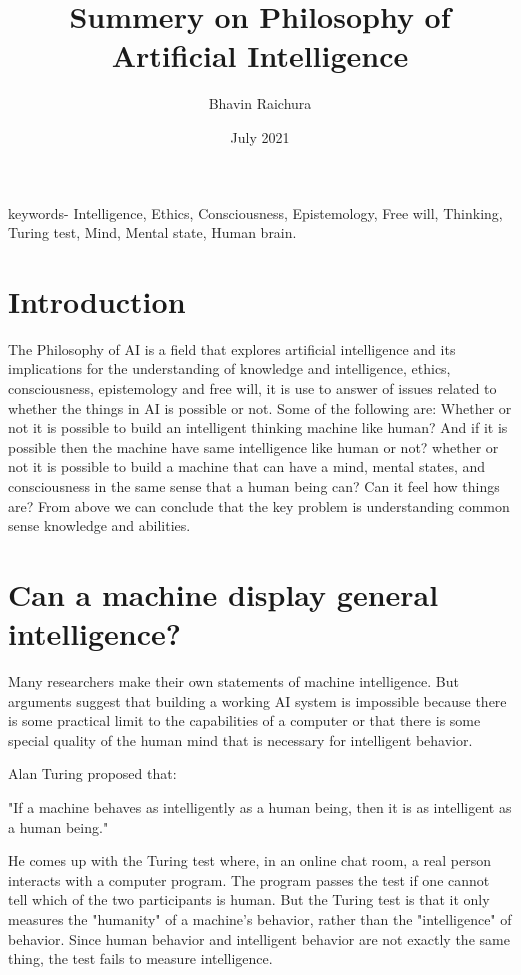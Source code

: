 \documentclass{article}
\title{Summery on Philosophy of  Artificial Intelligence}
\author{Bhavin Raichura}
\date{July 2021}
\begin{document}
\maketitle

\begin{keyword}
keywords- Intelligence, Ethics, Consciousness, Epistemology, Free will, Thinking, Turing test, Mind, Mental state, Human brain.

\end{keyword}

\section{Introduction}
The Philosophy of AI is a field that explores artificial intelligence and its implications for the understanding of knowledge and intelligence, ethics, consciousness, epistemology and free will, it is use to answer of issues related to whether the things in AI is possible or not. Some of the following are:
Whether or not it is possible to build an intelligent thinking machine like human? 
And if it is possible then the machine have same intelligence like human or not? 
whether or not it is possible to build a machine that can have a mind, mental states, and consciousness in the same sense that a human being can? Can it feel how things are?
From above we can conclude that the key problem is understanding common sense knowledge and abilities. 



\section{Can a machine display general intelligence?}
Many researchers make their own statements of machine intelligence. But arguments suggest that building a working AI system is impossible because there is some practical limit to the capabilities of a computer or that there is some special quality of the human mind that is necessary for intelligent behavior.

Alan Turing proposed that: 

"If a machine behaves as intelligently as a human being, then it is as intelligent as a human being."

He comes up with the Turing test where, in an online chat room, a real person interacts with a computer program. The program passes the test if one cannot tell which of the two participants is human.
But the Turing test is that it only measures the "humanity" of a machine's behavior, rather than the "intelligence" of behavior. Since human behavior and intelligent behavior are not exactly the same thing, the test fails to measure intelligence.
\end{document}
